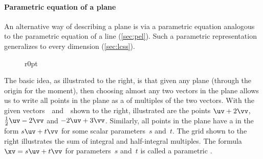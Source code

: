 



\paragraph{Parametric equation of a plane}
An alternative way of describing a plane is via a parametric equation analogous to the parametric equation of a line (\cref{sec:pel}).
Such a parametric representation generalizes to every dimension (\cref{sec:lcss}).

\begin{wrapfigure}r{0pt}
\end{wrapfigure}
The basic idea, as illustrated to the right, is that given any plane (through the origin for the moment), then choosing almost any two vectors in the plane allows us to write all points in the plane as a  of multiples of the two vectors.
With the given vectors~\uv\ and~\vv\ shown to the right, illustrated are the points \(\uv+2\vv\), \(\tfrac12\uv-2\vv\) and \(-2\uv+3\vv\).
Similarly, all points in the plane have a  in the form \(s\uv+t\vv\) for some scalar parameters~\(s\) and~\(t\).
The grid shown to the right illustrates the sum of integral and half-integral multiples.
The formula \(\xv=s\uv+t\vv\) for parameters~\(s\) and~\(t\) is called a parametric .



